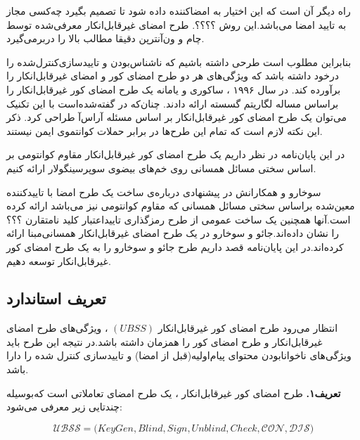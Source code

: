 \documentclass[12pt,a4paper]{article}
\theoremstyle{plain}
\theoremstyle{definition}
\theoremstyle{remark}
\begin{document}
راه دیگر آن است که این اختیار به امضاکننده داده شود تا تصمیم بگیرد چه‌کسی مجاز به تایید امضا می‌باشد.این روش ؟؟؟؟.
طرح امضای غیرقابل‌انکار معرفی‌شده توسط چام و ون‌آنترپن 
\cite{undeniable_chaum}
دقیقا مطالب بالا
 را دربرمی‌گیرد. 
 
بنابراین مطلوب است طرحی داشته باشیم که ناشناس‌بودن و تاییدسازی‌کنترل‌شده را درخود داشته باشد که ویژگی‌های هر دو طرح امضای کور و امضای غیرقابل‌انکار را برآورده کند.
در سال ۱۹۹۶ ، ساکوری و یامانه 
\cite{1st_blind_undeniable_sig}
یک طرح امضای کور غیرقابل‌انکار را براساس مساله لگاریتم گسسته ارائه دادند. چنان‌که در 
\cite{undeniable_chaum}
گفته‌شده‌است با این تکنیک می‌توان یک طرح امضای کور غیرقابل‌انکار بر اساس مسئله آراس‌آ 
طراحی کرد. ذکر این نکته لازم است که تمام این طرح‌ها در برابر حملات کوانتموی ایمن نیستند.

در این پایان‌نامه در نظر داریم یک طرح امضای کور غیرقابل‌انکار مقاوم کوانتومی بر اساس سختی مسائل همسانی روی خم‌های بیضوی سوپرسینگولار ارائه کنیم.


سوخارو و همکارانش در 
\cite{soukharev}
پیشنهادی درباره‌ی ساخت یک طرح امضا با تاییدکننده معین‌شده براساس سختی مسائل همسانی که مقاوم کوانتومی نیز می‌باشد ارائه کرده است.آنها همچنین یک ساخت عمومی از طرح رمزگذاری تایید‌اعتبار کلید نامتقارن ؟؟؟ را نشان داده‌اند.جائو و سوخارو در
\cite{undeniable}
یک طرح امضای غیرقابل‌انکار همسانی‌مبنا ارائه کرده‌اند.در این پایان‌نامه قصد داریم طرح جائو‌ و سوخارو را به یک طرح امضای کور غیرقابل‌انکار توسعه دهیم.

\subsection{تعریف استاندارد}\label{blind_def}

انتظار می‌رود طرح امضای کور غیرقابل‌انکار
$(UBSS)$
، ویژگی‌های طرح امضای غیرقابل‌انکار و طرح امضای کور را همزمان داشته باشد.در نتیجه این طرح باید ویژگی‌های ناخوانابودن محتوای پیام‌اولیه(قبل از امضا)
 و تاییدسازی کنترل شده 
 را دارا باشد.

\textbf{تعریف۱.}\label{definition_ubss}
طرح امضای کور غیرقابل‌انکار ، یک طرح امضای تعاملاتی است که‌بوسیله چندتایی زیر معرفی می‌شود:

$$ \mathcal{UBSS} = \big( KeyGen , Blind , Sign , Unblind , Check , \mathcal{CON} , \mathcal{DIS} \big) $$
\end{document}
